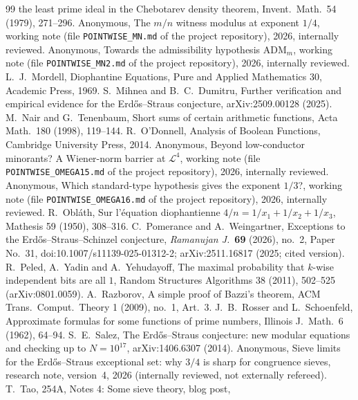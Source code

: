 \documentclass[11pt,reqno]{amsart}
\theoremstyle{definition}
\begin{document}
\begin{thebibliography}{99}
the least prime ideal in the Chebotarev density theorem, Invent.\ Math.\ 54
(1979), 271--296.
 Anonymous, The $m/n$ witness modulus at exponent $1/4$, working
note (file \texttt{POINTWISE\_MN.md} of the project repository), 2026,
internally reviewed.
 Anonymous, Towards the admissibility hypothesis $\mathrm{ADM}_m$,
working note (file \texttt{POINTWISE\_MN2.md} of the project repository), 2026,
internally reviewed.
 L.~J.~Mordell, Diophantine Equations, Pure and Applied
Mathematics 30, Academic Press, 1969.
 S.~Mihnea and B.~C.~Dumitru, Further verification and empirical
evidence for the Erd\H{o}s--Straus conjecture, arXiv:2509.00128 (2025).
 M.~Nair and G.~Tenenbaum, Short sums of certain arithmetic
functions, Acta Math.\ 180 (1998), 119--144.
 R.~O'Donnell, Analysis of Boolean Functions, Cambridge University
Press, 2014.
 Anonymous, Beyond low-conductor minorants? A Wiener-norm barrier
at $\mathcal L^4$, working note (file \texttt{POINTWISE\_OMEGA15.md} of the
project repository), 2026, internally reviewed.
 Anonymous, Which standard-type hypothesis gives the exponent
$1/3$?, working note (file \texttt{POINTWISE\_OMEGA16.md} of the project
repository), 2026, internally reviewed.
 R.~Obl\'ath, Sur l'\'equation diophantienne
$4/n=1/x_1+1/x_2+1/x_3$, Mathesis 59 (1950), 308--316.
 C.~Pomerance and A.~Weingartner, Exceptions to the
Erd\H{o}s--Straus--Schinzel conjecture, \emph{Ramanujan J.}\ \textbf{69} (2026), no.~2, Paper No.~31,
doi:10.1007/s11139-025-01312-2; arXiv:2511.16817 (2025;
cited version).
 R.~Peled, A.~Yadin and A.~Yehudayoff, The maximal probability
that $k$-wise independent bits are all $1$, Random Structures Algorithms 38
(2011), 502--525 (arXiv:0801.0059).
 A.~Razborov, A simple proof of Bazzi's theorem, ACM Trans.\
Comput.\ Theory 1 (2009), no.~1, Art.~3.
 J.~B.~Rosser and L.~Schoenfeld, Approximate formulas for some
functions of prime numbers, Illinois J.\ Math.\ 6 (1962), 64--94.
\bibitem{Salez} S.~E.~Salez, The Erd\H{o}s--Straus conjecture: new modular
equations and checking up to $N=10^{17}$, arXiv:1406.6307 (2014).
\bibitem{SL} Anonymous, Sieve limits for the Erd\H{o}s--Straus exceptional set:
why $3/4$ is sharp for congruence sieves, research note, version~4, 2026
(internally reviewed, not externally refereed).
 T.~Tao, 254A, Notes 4: Some sieve theory, blog post,

\end{thebibliography}
\end{document}

